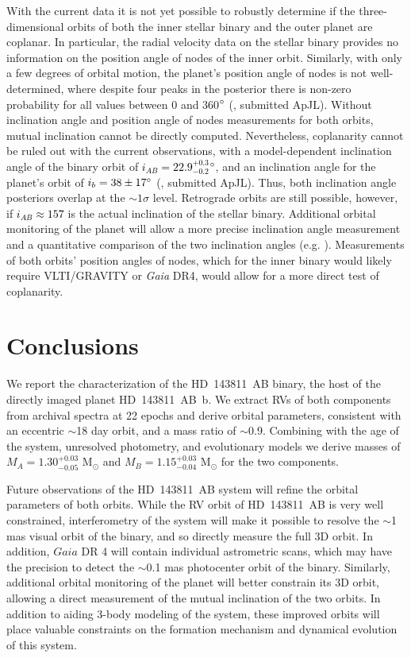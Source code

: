 \documentclass[]{aastex701} %
\begin{document}
With the current data it is not yet possible to robustly determine if the three-dimensional orbits of both the inner stellar binary and the outer planet are coplanar. In particular, the radial velocity data on the stellar binary provides no information on the position angle of nodes of the inner orbit. Similarly, with only a few degrees of orbital motion, the planet's position angle of nodes is not well-determined, where despite four peaks in the posterior there is non-zero probability for all values between 0 and 360$\degree$ (\citealt{Jones2025}, submitted ApJL). Without inclination angle and position angle of nodes measurements for both orbits, mutual inclination cannot be directly computed. Nevertheless, coplanarity cannot be ruled out with the current observations, with a model-dependent inclination angle of the binary orbit of \textcolor{black}{$i_{AB} = 22.9^{+0.3}_{-0.2} $$ \degree$}, and an inclination angle for the planet's orbit of $i_{b} = 38 \pm 17 \degree$ (\citealt{Jones2025}, submitted ApJL). Thus, both inclination angle posteriors overlap at the $\sim 1 \sigma$ level. Retrograde orbits are still possible, however, if \textcolor{black}{$i_{AB} \approx 157$} is the actual inclination of the stellar binary. Additional orbital monitoring of the planet will allow a more precise inclination angle measurement and a quantitative comparison of the two inclination angles (e.g. \citealt{kennedy:2013}). Measurements of both orbits' position angles of nodes, which for the inner binary would likely require VLTI/GRAVITY or \textit{Gaia} DR4, would allow for a more direct test of coplanarity.


\section{Conclusions}

We report the characterization of the HD~143811~AB binary, the host of the directly imaged planet HD~143811~AB~b. We extract RVs of both components from archival spectra at 22 epochs and derive orbital parameters, consistent with an eccentric $\sim$18 day orbit, and a mass ratio of $\sim$0.9. Combining with the age of the system, unresolved photometry, and evolutionary models we derive masses of $M_A = 1.30^{+0.03}_{-0.05}$ M$_\odot$ and $M_B = 1.15^{+0.03}_{-0.04}$ M$_\odot$ for the two components.

Future observations of the HD~143811~AB system will refine the orbital parameters of both orbits. While the RV orbit of HD~143811~AB is very well constrained, interferometry of the system will make it possible to resolve the $\sim$1 mas visual orbit of the binary, and so directly measure the full 3D orbit. In addition, $Gaia$ DR 4 will contain individual astrometric scans, which may have the precision to detect the $\sim$0.1 mas photocenter orbit of the binary. Similarly, additional orbital monitoring of the planet will better constrain its 3D orbit, allowing a direct measurement of the mutual inclination of the two orbits. In addition to aiding 3-body modeling of the system, these improved orbits will place valuable constraints on the formation mechanism and dynamical evolution of this system.
\end{document}
